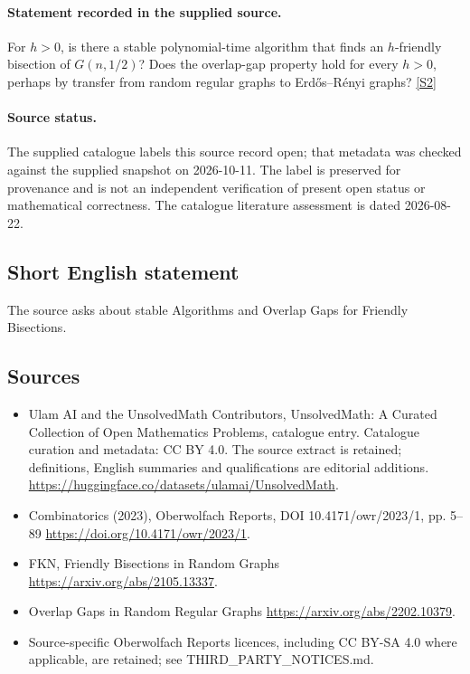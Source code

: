 \documentclass[11pt]{article}
\begin{document}
\paragraph{Statement recorded in the supplied source.}
For $h>0$, is there a stable polynomial-time algorithm that finds an $h$-friendly bisection of $G(n,1/2)$? Does the overlap-gap property hold for every $h>0$, perhaps by transfer from random regular graphs to Erdős–Rényi graphs? \href{https://doi.org/10.4171/owr/2023/1}{[S2]}
\paragraph{Source status.}
The supplied catalogue labels this source record open; that metadata was checked against the supplied snapshot on 2026-10-11. The label is preserved for provenance and is not an independent verification of present open status or mathematical correctness. The catalogue literature assessment is dated 2026-08-22.
\subsection{Short English statement}
The source asks about stable Algorithms and Overlap Gaps for Friendly Bisections.
\subsection{Sources}
\begin{itemize}
\item[S1] Ulam AI and the UnsolvedMath Contributors, UnsolvedMath: A Curated Collection of Open Mathematics Problems, catalogue entry. Catalogue curation and metadata: CC BY 4.0. The source extract is retained; definitions, English summaries and qualifications are editorial additions.
\url{https://huggingface.co/datasets/ulamai/UnsolvedMath}.
\item[S2] Combinatorics (2023), Oberwolfach Reports, DOI 10.4171/owr/2023/1, pp. 5--89
\url{https://doi.org/10.4171/owr/2023/1}.
\item[S3] FKN, Friendly Bisections in Random Graphs
\url{https://arxiv.org/abs/2105.13337}.
\item[S4] Overlap Gaps in Random Regular Graphs
\url{https://arxiv.org/abs/2202.10379}.
\item Source-specific Oberwolfach Reports licences, including CC BY-SA 4.0 where applicable, are retained; see THIRD\_PARTY\_NOTICES.md.
\end{itemize}
\end{document}

